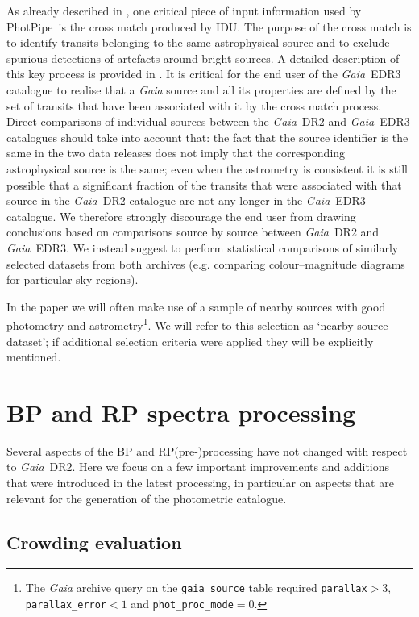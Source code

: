 \documentclass{aa}
\newcommand{\gaia}{\textit{Gaia}\xspace}
\newcommand{\PP}{\textsf{PhotPipe}}
\newcommand{\drt}{\gaia~DR2\xspace}
\newcommand{\edr}{\gaia~EDR3\xspace}
\newcommand{\xp}{BP and RP\xspace}
\begin{document}
As already described in \cite{Proc_DR2}, one critical piece of input information used by \PP\ is the cross match produced by IDU. The purpose of the cross match is to identify transits belonging to the same astrophysical source and to exclude spurious detections of artefacts around bright sources. A detailed description of this key process is provided in \cite{EDR3_XM}. It is critical for the end user of the \edr catalogue to realise that a \gaia source and all its properties are defined by the set of transits that have been associated with it by the cross match process. Direct comparisons of individual sources between the \drt and \edr catalogues should take into account that: the fact that the source identifier is the same in the two data releases does not imply that the corresponding astrophysical source is the same; even when the astrometry is consistent it is still possible that a significant fraction of the transits that were associated with that source in the \drt catalogue are not any longer in the \edr catalogue. We therefore strongly discourage the end user from drawing conclusions based on comparisons source by source between \drt and \edr. We instead suggest to perform statistical comparisons of similarly selected datasets from both archives (e.g. comparing colour--magnitude diagrams for particular sky regions). 

In the paper we will often make use of a sample of nearby sources with good photometry and astrometry\footnote{The \gaia archive query on the \texttt{gaia\_source} table required \texttt{parallax}$>3$, \texttt{parallax\_error}$<1$ and \texttt{phot\_proc\_mode}$=0$.}. We will refer to this selection as `nearby source dataset'; if additional selection criteria were applied they will be explicitly mentioned.

\section{\xp spectra processing}\label{sec:bprp}
 
Several aspects of the \xp (pre-)processing have not changed with respect to \drt. Here we focus on a few important improvements and additions that were introduced in the latest processing, in particular on aspects that are relevant for the generation of the photometric catalogue.

\subsection{Crowding evaluation}\label{sec:crowding}
\end{document}
